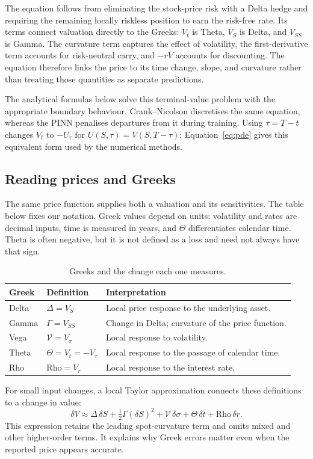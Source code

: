 \documentclass[11pt,a4paper]{article}
\begin{document}
The equation follows from eliminating the stock-price risk with a
Delta hedge and requiring the remaining locally riskless position to earn
the risk-free rate. Its terms connect valuation directly to the Greeks:
$V_t$ is Theta, $V_S$ is Delta, and $V_{SS}$ is Gamma. The curvature term
captures the effect of volatility, the first-derivative term accounts for
risk-neutral carry, and $-rV$ accounts for discounting. The equation therefore
links the price to its time change, slope, and curvature rather than treating
those quantities as separate predictions.

The analytical formulas below solve this terminal-value problem with the
appropriate boundary behaviour. Crank--Nicolson discretises the same equation,
whereas the PINN penalises departures from it during training. Using
$\tau=T-t$ changes $V_t$ to $-U_\tau$ for $U(S,\tau)=V(S,T-\tau)$;
Equation~\eqref{eq:pde} gives this equivalent form used by the numerical methods.

\subsection{Reading prices and Greeks}
The same price function supplies both a valuation and its sensitivities. The table below fixes our notation. Greek values depend on units: volatility and rates are decimal inputs, time is measured in years, and $\Theta$ differentiates calendar time. Theta is often negative, but it is not defined as a loss and need not always have that sign.
\begin{table}[!ht]\centering\small
\caption{Greeks and the change each one measures.}
\label{tab:greeks}
\begin{tabular}{llp{7.5cm}}\toprule
Greek & Definition & Interpretation\\\midrule
Delta & $\Delta=V_S$ & Local price response to the underlying asset.\\
Gamma & $\Gamma=V_{SS}$ & Change in Delta; curvature of the price function.\\
Vega & $\mathcal V=V_\sigma$ & Local response to volatility.\\
Theta & $\Theta=V_t=-V_\tau$ & Local response to the passage of calendar time.\\
Rho & $\mathrm{Rho}=V_r$ & Local response to the interest rate.\\\bottomrule
\end{tabular}\end{table}
For small input changes, a local Taylor approximation connects these definitions to a change in value:
\begin{equation}
\delta V\approx\Delta\,\delta S+\tfrac12\Gamma(\delta S)^2
+\mathcal V\,\delta\sigma+\Theta\,\delta t+\mathrm{Rho}\,\delta r.
\end{equation}
This expression retains the leading spot-curvature term and omits mixed and other higher-order terms. It explains why Greek errors matter even when the reported price appears accurate.
\end{document}
